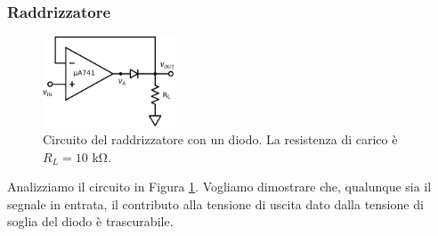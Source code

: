 
\subsubsection{Raddrizzatore}

\begin{figure}
  \begin{center}
    \includegraphics[width=0.350\textwidth]{../E05/latex/c_rectifier_A.pdf}
  \end{center}
  \caption{Circuito del raddrizzatore con un diodo. La resistenza di carico è $R_L=10$ \si{\kilo\ohm}.}
  \label{cir5:raddrizz_1}
\end{figure}

Analizziamo il circuito in Figura \ref{cir5:raddrizz_1}. Vogliamo dimostrare che, qualunque sia il segnale in entrata, il contributo alla tensione di uscita dato dalla tensione di soglia del diodo è trascurabile.

